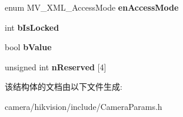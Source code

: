 \begin{DoxyCompactItemize}
\item 
\mbox{\label{struct___m_v___x_m_l___f_e_a_t_u_r_e___boolean___a36bdc249a45955cf50a7280c2daec25a}} 
enum M\+V\+\_\+\+X\+M\+L\+\_\+\+Access\+Mode {\bfseries en\+Access\+Mode}
\item 
\mbox{\label{struct___m_v___x_m_l___f_e_a_t_u_r_e___boolean___a269c774f1692151eedcc5f292ee289e2}} 
int {\bfseries b\+Is\+Locked}
\item 
\mbox{\label{struct___m_v___x_m_l___f_e_a_t_u_r_e___boolean___acc72256039cd7627a5245d0b3e3225ec}} 
bool {\bfseries b\+Value}
\item 
\mbox{\label{struct___m_v___x_m_l___f_e_a_t_u_r_e___boolean___a1bac78d8c0ffc9d236952f3089ae1353}} 
unsigned int {\bfseries n\+Reserved} \mbox{[}4\mbox{]}
\end{DoxyCompactItemize}


该结构体的文档由以下文件生成\+:\begin{DoxyCompactItemize}
\item 
camera/hikvision/include/Camera\+Params.\+h\end{DoxyCompactItemize}
